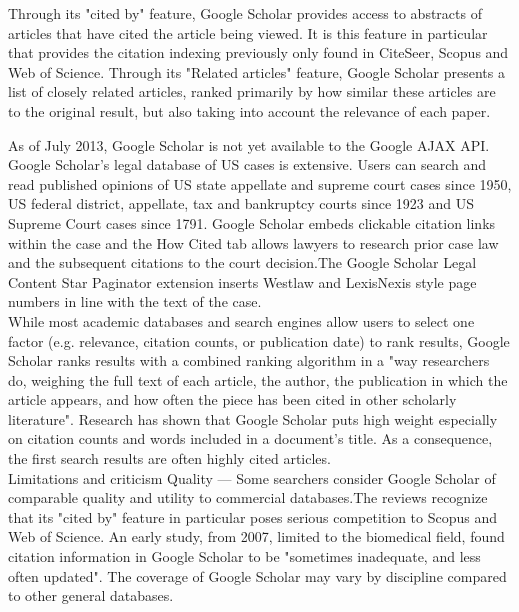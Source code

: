 \begin{enumerate}
	Through its "cited by" feature, Google Scholar provides access to abstracts of articles that have cited the article being viewed. It is this feature in particular that provides the citation indexing previously only found in CiteSeer, Scopus and Web of Science. Through its "Related articles" feature, Google Scholar presents a list of closely related articles, ranked primarily by how similar these articles are to the original result, but also taking into account the relevance of each paper.
	
	As of July 2013, Google Scholar is not yet available to the Google AJAX API.\\
	
	Google Scholar's legal database of US cases is extensive. Users can search and read published opinions of US state appellate and supreme court cases since 1950, US federal district, appellate, tax and bankruptcy courts since 1923 and US Supreme Court cases since 1791. Google Scholar embeds clickable citation links within the case and the How Cited tab allows lawyers to research prior case law and the subsequent citations to the court decision.The Google Scholar Legal Content Star Paginator extension inserts Westlaw and LexisNexis style page numbers in line with the text of the case.\\
	
	While most academic databases and search engines allow users to select one factor (e.g. relevance, citation counts, or publication date) to rank results, Google Scholar ranks results with a combined ranking algorithm in a "way researchers do, weighing the full text of each article, the author, the publication in which the article appears, and how often the piece has been cited in other scholarly literature". Research has shown that Google Scholar puts high weight especially on citation counts and words included in a document's title. As a consequence, the first search results are often highly cited articles.\\
		
	Limitations and criticism
	Quality — Some searchers consider Google Scholar of comparable quality and utility to commercial databases.The reviews recognize that its "cited by" feature in particular poses serious competition to Scopus and Web of Science. An early study, from 2007, limited to the biomedical field, found citation information in Google Scholar to be "sometimes inadequate, and less often updated". The coverage of Google Scholar may vary by discipline compared to other general databases.
	

\end{enumerate}
